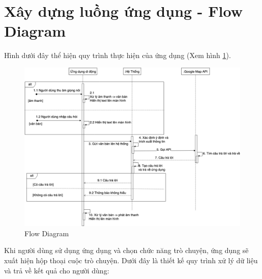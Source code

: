 \section{Xây dựng luồng ứng dụng - Flow Diagram}
Hình dưới đây thể hiện quy trình thực hiện của ứng dụng (Xem hình \ref{fig:Sequence-Diagram}). 
\begin{figure}[H]
    \centering
    \includegraphics[width=15cm]{images/ChatbotSRS-Sequence.png}
    \caption{Flow Diagram}
    \label{fig:Sequence-Diagram}
\end{figure}
Khi người dùng sử dụng ứng dụng và chọn chức năng trò chuyện, ứng dụng sẽ xuất hiện hộp thoại cuộc trò chuyện. Dưới đây là thiết kế quy trình xử lý dữ liệu và trả về kết quả cho người dùng:

